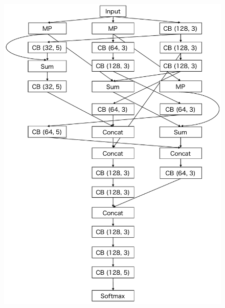 \begin{figure}[t]
 \begin{minipage}[b]{0.45\linewidth}
  \centering
  \includegraphics[keepaspectratio, scale=0.4, bb=0 0 600 827]{images/modelA.pdf}
  \label{modelA}
 \end{minipage}
 \begin{minipage}[b]{0.45\linewidth}
  \centering

\end{minipage}
\end{figure}
